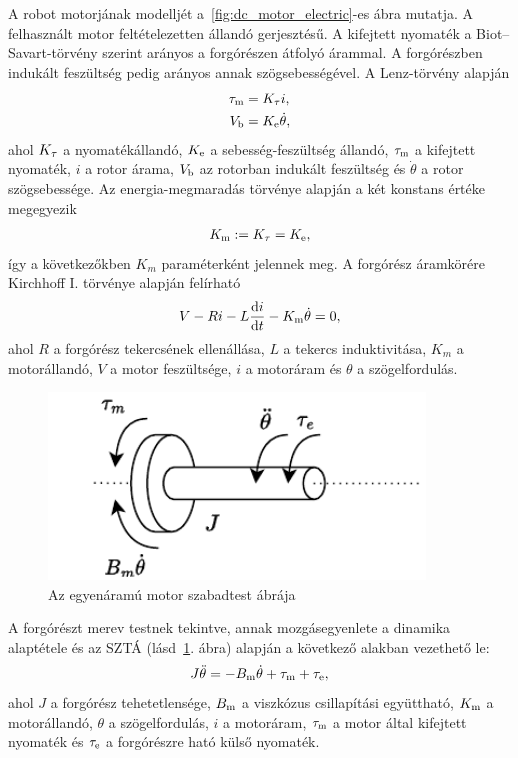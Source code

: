 A robot motorjának modelljét a~\ref{fig:dc_motor_electric}-es ábra mutatja. A felhasznált motor feltételezetten állandó gerjesztésű. A kifejtett nyomaték 
a Biot--Savart-törvény szerint arányos a forgórészen átfolyó árammal. A forgórészben
indukált feszültség pedig arányos annak szögsebességével. A Lenz-törvény alapján 
\begin{equation}
\begin{split}
    \tau_{\mathrm{m}} &= K_{\mathrm{\tau}} i, \\
    V_{\mathrm{b}} &= K_{\mathrm{e}} \dot\theta,
\end{split}
\end{equation}
ahol $K_{\mathrm{\tau}}$ a nyomatékállandó, $K_{\mathrm{e}}$ a sebesség-feszültség állandó, $\tau_{\mathrm{m}}$ a kifejtett 
nyomaték, $i$ a rotor árama, $V_{\mathrm{b}}$ az rotorban indukált feszültség és $\dot\theta$ a rotor szögsebessége.
Az energia-megmaradás törvénye alapján a két konstans értéke megegyezik
\begin{align}
    K_{\mathrm{m}} := K_{\mathrm{\tau}} = K_{\mathrm{e}},
\end{align}
így a következőkben $K_m$ paraméterként jelennek meg. A forgórész áramkörére Kirchhoff I. törvénye alapján felírható
\begin{align}\label{eq:armature_circuit}
    V - Ri - L\frac{\mathrm{d} i}{\mathrm{d} t} - K_{\mathrm{m}}\dot\theta = 0,
\end{align}
ahol $R$ a forgórész tekercsének ellenállása, $L$ a tekercs induktivitása, 
$K_m$ a motorállandó, $V$ a motor feszültsége, $i$ a motoráram és $\theta$ a szögelfordulás.
\begin{figure}[h]
    \begin{center}
    \includegraphics[width=10cm]{images/motor_model_mechanical.pdf}
    \caption{Az egyenáramú motor szabadtest ábrája}
    \label{fig:dc_motor_mechanical}
    \end{center}
\end{figure}
A forgórészt merev testnek tekintve, annak mozgásegyenlete a dinamika alaptétele és az SZTÁ (lásd~\ref{fig:dc_motor_mechanical}. ábra) 
alapján a következő alakban vezethető le:
\begin{align}\label{eq:rotor_dynamics}
    J\ddot\theta = -B_{\mathrm{m}}\dot\theta + \tau_{\mathrm{m}} + \tau_{\mathrm{e}},
\end{align}
ahol $J$ a forgórész tehetetlensége, $B_{\mathrm{m}}$ a viszkózus csillapítási együttható, 
$K_{\mathrm{m}}$ a motorállandó, $\theta$ a szögelfordulás, $i$ a motoráram, $\tau_{\mathrm{m}}$ a motor által kifejtett nyomaték 
és $\tau_{\mathrm{e}}$ a forgórészre ható külső nyomaték. 
    
